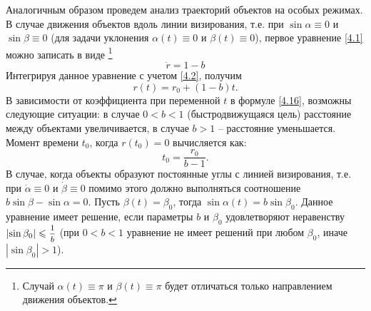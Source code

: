 \documentclass[a4paper,12pt, openany]{book}
\theoremstyle{plain} %
\theoremstyle{definition} %
\theoremstyle{remark} %
\numberwithin{equation}{chapter}
\begin{document}
{Аналогичным образом проведем анализ траекторий объектов на особых режимах. В случае движения объектов вдоль линии визирования, т.е. при $\sin\alpha \equiv 0$ и $\sin\beta \equiv 0$ (для задачи уклонения $\alpha(t) \equiv 0$ и $\beta(t) \equiv 0$), первое уравнение \eqref{4.1} можно записать в виде \footnote{Случай $\alpha(t) \equiv \pi$ и $\beta(t) \equiv \pi$ будет отличаться только направлением движения объектов.}
\begin{equation}\label{4.15}
\dot r =   1 - b
\end{equation}
Интегрируя данное уравнение с учетом \eqref{4.2}, получим
\begin{equation}\label{4.16}
r\left( t \right) = r_0  + \left( {1 - b} \right)t.
\end{equation}
В зависимости от коэффициента при переменной $t$ в формуле \eqref{4.16}, возможны следующие ситуации: в случае $0<b<1$ (быстродвижущаяся цель) расстояние между объектами увеличивается, в случае $b>1$ -- расстояние уменьшается. Момент времени $t_0$, когда $r(t_0) = 0$ вычисляется как:
\[
t_0  = \frac{{r_0 }}
{{b - 1}}.
\]
В случае, когда объекты образуют постоянные углы с линией визирования, т.е. при $\dot\alpha \equiv 0$ и $\dot\beta \equiv 0$ помимо этого должно выполняться соотношение $b\sin\beta - \sin\alpha = 0$. Пусть $\beta(t) = \beta_0$, тогда $\sin\alpha(t) = b\sin\beta_0$. Данное уравнение имеет решение, если параметры $b$ и $\beta_0$ удовлетворяют неравенству $
\left| {\sin \beta _0 } \right| \leqslant \mfrac{1}
{b}
$ (при $0<b<1$ уравнение не имеет решений при любом $\beta_0$, иначе $\left|\sin\beta_0\right| > 1$).

}
\end{document}
